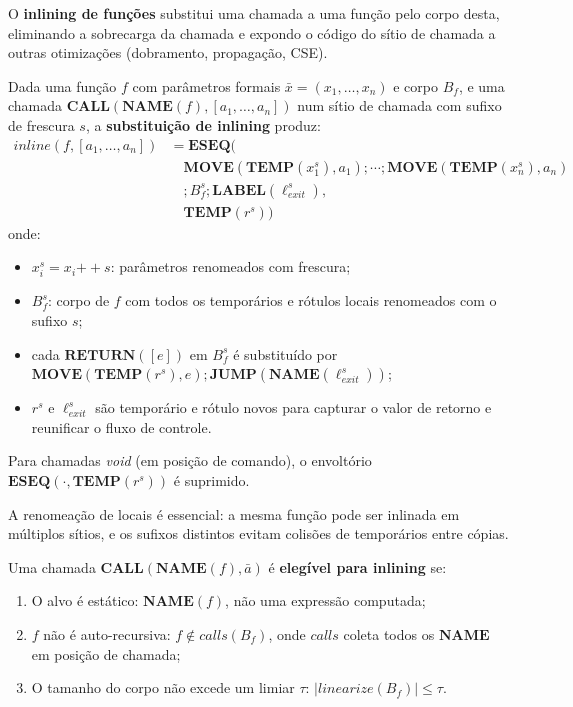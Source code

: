 O \textbf{inlining de funções} substitui uma chamada a uma função pelo corpo
desta, eliminando a sobrecarga da chamada e expondo o código do sítio de chamada
a outras otimizações (dobramento, propagação, CSE).

\begin{Definition}\label{def:inline}
  Dada uma função $f$ com parâmetros formais $\bar{x} = (x_1, \ldots, x_n)$ e
  corpo $B_f$, e uma chamada $\mathbf{CALL}(\mathbf{NAME}(f), [a_1,\ldots,a_n])$
  num sítio de chamada com sufixo de frescura $s$, a \textbf{substituição de
  inlining} produz:
  \[
    \begin{aligned}
      \mathit{inline}(f, [a_1,\ldots,a_n])
      &= \mathbf{ESEQ}( \\
        &\quad \mathbf{MOVE}(\mathbf{TEMP}(x_1^s), a_1) \mathbin{;}
        \cdots \mathbin{;}
        \mathbf{MOVE}(\mathbf{TEMP}(x_n^s), a_n) \\
        &\quad \mathbin{;} B_f^s \mathbin{;}
        \mathbf{LABEL}(\ell_\mathit{exit}^s), \\
      &\quad \mathbf{TEMP}(r^s))
    \end{aligned}
  \]
  onde:
  \begin{itemize}
    \item $x_i^s = x_i \mathbin{++} s$: parâmetros renomeados com frescura;
    \item $B_f^s$: corpo de $f$ com todos os temporários e rótulos locais
      renomeados com o sufixo $s$;
    \item cada $\mathbf{RETURN}([e])$ em $B_f^s$ é substituído por
      $\mathbf{MOVE}(\mathbf{TEMP}(r^s), e) \mathbin{;}
      \mathbf{JUMP}(\mathbf{NAME}(\ell_\mathit{exit}^s))$;
    \item $r^s$ e $\ell_\mathit{exit}^s$ são temporário e rótulo novos para
      capturar o valor de retorno e reunificar o fluxo de controle.
  \end{itemize}
  Para chamadas \emph{void} (em posição de comando), o envoltório
  $\mathbf{ESEQ}(\cdot, \mathbf{TEMP}(r^s))$ é suprimido.
\end{Definition}

A renomeação de locais é essencial: a mesma função pode ser inlinada
em múltiplos
sítios, e os sufixos distintos evitam colisões de temporários entre cópias.

\begin{Definition}\label{def:inline-eligible}
  Uma chamada $\mathbf{CALL}(\mathbf{NAME}(f), \bar{a})$ é \textbf{elegível
  para inlining} se:
  \begin{enumerate}
    \item O alvo é estático: $\mathbf{NAME}(f)$, não uma expressão computada;
    \item $f$ não é auto-recursiva: $f \notin \mathit{calls}(B_f)$, onde
      $\mathit{calls}$ coleta todos os $\mathbf{NAME}$ em posição de chamada;
    \item O tamanho do corpo não excede um limiar $\tau$:
      $|\mathit{linearize}(B_f)| \leq \tau$.
  \end{enumerate}
\end{Definition}

